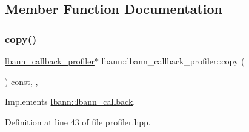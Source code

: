 \subsection{Member Function Documentation}
\mbox{\label{classlbann_1_1lbann__callback__profiler_a53351de95859a8a9f3a689ed72970663}} 
\subsubsection{\texorpdfstring{copy()}{copy()}}
{\footnotesize\ttfamily \hyperlink{classlbann_1_1lbann__callback__profiler}{lbann\+\_\+callback\+\_\+profiler}$\ast$ lbann\+::lbann\+\_\+callback\+\_\+profiler\+::copy (\begin{DoxyParamCaption}{ }\end{DoxyParamCaption}) const\hspace{0.3cm}{\ttfamily [inline]}, {\ttfamily [override]}, {\ttfamily [virtual]}}



Implements \hyperlink{classlbann_1_1lbann__callback_a9f545d1269a8c7af335625d049691f26}{lbann\+::lbann\+\_\+callback}.



Definition at line 43 of file profiler.\+hpp.


